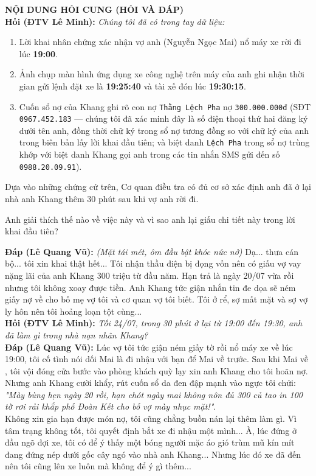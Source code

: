 \documentclass[12pt,a4paper]{article}
\begin{document}
\vspace{0.3cm}\noindent\textbf{\large NỘI DUNG HỎI CUNG (HỎI VÀ ĐÁP)}\\[0.15cm]


\noindent\textbf{Hỏi (ĐTV Lê Minh):} \textit{Chúng tôi đã có trong tay dữ liệu:}\\[0.15cm]
\begin{enumerate}[label=\arabic*., leftmargin=*, itemsep=2pt, topsep=2pt, parsep=0pt]
  \item Lời khai nhân chứng xác nhận vợ anh (Nguyễn Ngọc Mai) nổ máy xe rời đi lúc \textbf{19:00}.
  \item Ảnh chụp màn hình ứng dụng xe công nghệ trên máy của anh ghi nhận thời gian gửi lệnh đặt xe là \textbf{19:25:40} và tài xế đón lúc \textbf{19:30:15}.
  \item Cuốn sổ nợ của Khang ghi rõ con nợ \texttt{Thằng Lệch Pha} nợ \texttt{300.000.000đ} (SĐT \texttt{0967.452.183} — chúng tôi đã xác minh đây là số điện thoại thứ hai đăng ký dưới tên anh, đồng thời chữ ký trong sổ nợ tương đồng so với chữ ký của anh trong biên bản lấy lời khai đầu tiên; và biệt danh \texttt{Lệch Pha} trong sổ nợ trùng khớp với biệt danh Khang gọi anh trong các tin nhắn SMS gửi đến số \texttt{0988.20.09.91}).
\end{enumerate}
Dựa vào những chứng cứ trên, Cơ quan điều tra có đủ cơ sở xác định anh đã ở lại nhà anh Khang thêm 30 phút sau khi vợ anh rời đi.

Anh giải thích thế nào về việc này và vì sao anh lại giấu chi tiết này trong lời khai đầu tiên?


\noindent\textbf{Đáp (Lê Quang Vũ):} \textit{(Mặt tái mét, ôm đầu bật khóc nức nở)} Dạ... thưa cán bộ... tôi xin khai thật hết... Tôi nhận thầu điện bị đọng vốn nên có giấu vợ vay nặng lãi của anh Khang 300 triệu từ đầu năm. Hạn trả là ngày 20/07 vừa rồi nhưng tôi không xoay được tiền. Anh Khang tức giận nhắn tin đe dọa sẽ ném giấy nợ về cho bố mẹ vợ tôi và cơ quan vợ tôi biết. Tôi ở rể, sợ mất mặt và sợ vợ ly hôn nên tôi hoảng loạn tột cùng...\\[0.35cm]

\noindent\textbf{Hỏi (ĐTV Lê Minh):} \textit{Tối 24/07, trong 30 phút ở lại từ 19:00 đến 19:30, anh đã làm gì trong nhà nạn nhân Khang?}\\[0.15cm]

\noindent\textbf{Đáp (Lê Quang Vũ):} Lúc vợ tôi tức giận ném giấy tờ rồi nổ máy xe về lúc 19:00, tôi cố tình nói dối Mai là đi nhậu với bạn để Mai về trước. Sau khi Mai về , tôi vội đóng cửa bước vào phòng khách quỳ lạy xin anh Khang cho tôi hoãn nợ. Nhưng anh Khang cười khẩy, rút cuốn sổ da đen đập mạnh vào ngực tôi chửi: \textit{"Mày bùng hẹn ngày 20 rồi, hạn chót ngày mai không nôn đủ 300 củ tao in 100 tờ rơi rải khắp phố Đoàn Kết cho bố vợ mày nhục mặt!"}.\\[0.35cm]
Không xin gia hạn được món nợ, tôi cũng chẳng buồn nán lại thêm làm gì. Vì tâm trạng không tốt, tôi quyết định bắt xe đi nhậu một mình... À, lúc đứng ở đầu ngõ đợi xe, tôi có để ý thấy một bóng người mặc áo gió trùm mũ kín mít đang đứng nép dưới gốc cây ngó vào nhà anh Khang... Nhưng lúc đó xe đã đến nên tôi cũng lên xe luôn mà không để ý gì thêm...
\end{document}
